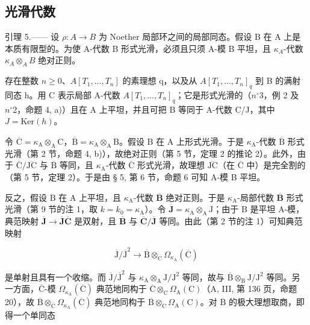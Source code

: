 \subsection{光滑代数}

引理 5.—— 设 \(\rho: A \to B\) 为 Noether 局部环之间的局部同态。假设 B 在 A 上是本质有限型的。为使 A-代数 B 形式光滑，必须且只须 A-模 B 平坦，且 \(\kappa_{A}\)-代数 \(\kappa_{A} \otimes_{A} B\) 绝对正则。

存在整数 \(n \geqslant 0\)、\(A[T_{1}, \ldots, T_{n}]\) 的素理想 q，以及从 \(A[T_{1}, \ldots, T_{n}]_{q}\) 到 B 的满射同态 h。用 C 表示局部 A-代数 \(A[T_{1}, \ldots, T_{n}]_{q}\)；它是形式光滑的（\(n^{\circ} 3\)，例 2 及 \(n^{\circ} 2\)，命题 4, a)）且在 A 上平坦，并且可把 B 等同于 A-代数 C/J，其中 \(J = \text{Ker}(h)\)。

令 \(\overline{\mathrm{C}} = \kappa_{\mathrm{A}} \otimes_{\mathrm{A}} \mathrm{C}\)，\(\overline{\mathrm{B}} = \kappa_{\mathrm{A}} \otimes_{\mathrm{A}} \mathrm{B}\)。假设 B 在 A 上形式光滑。于是 \(\kappa_{\mathrm{A}}\)-代数 \(\overline{\mathrm{B}}\) 形式光滑（第 2 节，命题 4, b)），故绝对正则（第 5 节，定理 2 的推论 2）。此外，由于 \(\overline{\mathrm{C}} / \overline{\mathrm{JC}}\) 与 \(\overline{\mathrm{B}}\) 等同，且 \(\kappa_{\mathrm{A}}\)-代数 \(\overline{\mathrm{C}}\) 形式光滑，故理想 \(\overline{\mathrm{JC}}\)（在 \(\overline{\mathrm{C}}\) 中）是完全割的（第 5 节，定理 2）。于是由 § 5, 第 6 节，命题 6 可知 A-模 B 平坦。

反之，假设 B 在 A 上平坦，且 \(\kappa_{\mathrm{A}}\)-代数 \(\overline{\mathbf{B}}\) 绝对正则。于是 \(\kappa_{\mathrm{A}}\)-局部代数 \(\overline{\mathbf{B}}\) 形式光滑（第 9 节的注 1，取 \(k = k_0 = \kappa_{\mathrm{A}}\)）。令 \(\overline{\mathbf{J}} = \kappa_{\mathrm{A}} \otimes_{\mathrm{A}} \mathrm{J}\)；由于 B 是平坦 A-模，典范映射 \(\overline{\mathbf{J}} \to \overline{\mathbf{J}}\overline{\mathbf{C}}\) 是双射，且 \(\overline{\mathbf{B}}\) 与 \(\overline{\mathbf{C}}/\overline{\mathbf{J}}\) 等同。由此（第 2 节的注 1）可知典范映射

\[
\overline {{\mathrm{J}}} / \overline {{\mathrm{J}}} ^ {2} \longrightarrow \overline {{\mathrm{B}}} \otimes_ {\overline {{\mathrm{C}}}} \Omega_ {\kappa_ {\mathrm{A}}} (\overline {{\mathrm{C}}})
\]

是单射且具有一个收缩。而 \(\overline{\mathrm{J}}/\overline{\mathrm{J}}^{2}\) 与 \(\kappa_{\mathrm{A}}\otimes_{\mathrm{A}}\mathrm{J}/\mathrm{J}^{2}\) 等同，故与 \(\overline{\mathrm{B}}\otimes_{\mathrm{B}}\mathrm{J}/\mathrm{J}^{2}\) 等同。另一方面，\(\overline{\mathrm{C}}\)-模 \(\Omega_{\kappa_{\mathrm{A}}}(\overline{\mathrm{C}})\) 典范地同构于 \(\overline{\mathrm{C}}\otimes_{\mathrm{C}}\Omega_{\mathrm{A}}(\mathrm{C})\)（A, III, 第 136 页，命题 20），故 \(\overline{\mathrm{B}}\otimes_{\overline{\mathrm{C}}}\Omega_{\kappa_{\mathrm{A}}}(\overline{\mathrm{C}})\) 典范地同构于 \(\overline{\mathrm{B}}\otimes_{\mathrm{C}}\Omega_{\mathrm{A}}(\mathrm{C})\)。对 \(\overline{\mathrm{B}}\) 的极大理想取商，即得一个单同态

